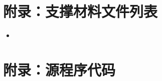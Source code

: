 \documentclass[a4paper,12pt]{ctexart}
\begin{document}
\appendix
\section{附录：支撑材料文件列表}
\begin{itemize}
  \item %
\end{itemize}

\section{附录：源程序代码}
\end{document}
